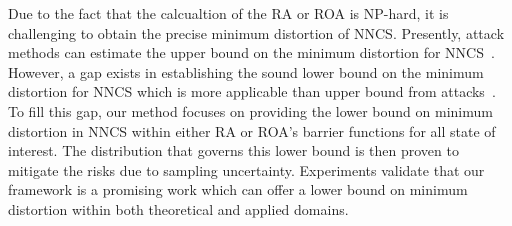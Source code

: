 \documentclass[conference]{IEEEtran}
\newcommand{\nncs}{\textsc{NNCS}\xspace}
\newcommand{\roa}{\textsc{ROA}\xspace}
\newcommand{\ra}{\textsc{RA}\xspace}
\begin{document}

Due to the fact that 
the calcualtion of the \ra or \roa 
is NP-hard, it is challenging 
to obtain the precise minimum distortion 
of \nncs. 
Presently, attack methods 
\cite{weng2018evaluating, zhao2024attack} can 
estimate the upper bound on 
the minimum distortion for \nncs~\cite{weng2018evaluating}. 
However, a gap exists in 
establishing the sound lower bound on the 
minimum distortion for \nncs which is more 
applicable than upper bound from attacks~\cite{wang2024survey}. 
To fill this gap, 
our method focuses on providing 
the lower bound on minimum distortion in \nncs 
within either \ra or \roa's barrier functions 
for all state of interest. 
The distribution that governs this lower bound 
is then proven to mitigate the risks 
due to sampling uncertainty. 
Experiments validate that our framework 
is a promising work which can 
offer a lower bound on minimum distortion 
within both theoretical and applied domains.

\end{document}
